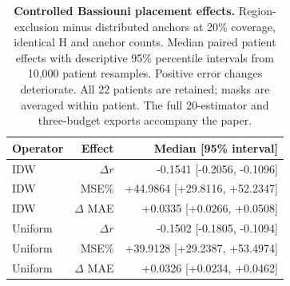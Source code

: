 \begin{table}[!htbp]
\caption{\textbf{Controlled Bassiouni placement effects.} Region-exclusion minus distributed anchors at 20\% coverage, identical H and anchor counts. Median paired patient effects with descriptive 95\% percentile intervals from 10,000 patient resamples. Positive error changes deteriorate. All 22 patients are retained; masks are averaged within patient. The full 20-estimator and three-budget exports accompany the paper.}
\label{tab:extension_placement}
\centering\footnotesize
\begin{tabular}{@{}lrr@{}}
\toprule
Operator & Effect & Median [95\% interval] \\
\midrule
IDW & $\Delta r$ & -0.1541 [-0.2056, -0.1096] \\
IDW & MSE\% & +44.9864 [+29.8116, +52.2347] \\
IDW & $\Delta$ MAE & +0.0335 [+0.0266, +0.0508] \\
Uniform & $\Delta r$ & -0.1502 [-0.1805, -0.1094] \\
Uniform & MSE\% & +39.9128 [+29.2387, +53.4974] \\
Uniform & $\Delta$ MAE & +0.0326 [+0.0234, +0.0462] \\
\bottomrule
\end{tabular}
\end{table}
\FloatBarrier
